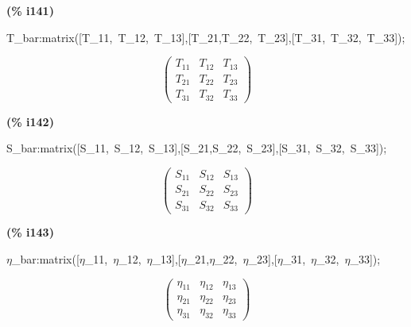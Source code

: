 \documentclass[fleqn]{article}
\begin{document}
\noindent
\begin{minipage}[t]{4.000000em}\color{red}\bfseries
(\% i141)	
\end{minipage}
\begin{minipage}[t]{\textwidth}\color{blue}
T\_bar:matrix([T\_11,\ T\_12,\ T\_13],[T\_21,T\_22,\ T\_23],[T\_31,\ T\_32,\ T\_33]);
\end{minipage}
\[\displaystyle \tag{\% o141} 
\begin{pmatrix}{T_{\ensuremath{\mathrm{11}}}} & {T_{\ensuremath{\mathrm{12}}}} & {T_{\ensuremath{\mathrm{13}}}}\\
{T_{\ensuremath{\mathrm{21}}}} & {T_{\ensuremath{\mathrm{22}}}} & {T_{\ensuremath{\mathrm{23}}}}\\
{T_{\ensuremath{\mathrm{31}}}} & {T_{\ensuremath{\mathrm{32}}}} & {T_{\ensuremath{\mathrm{33}}}}\end{pmatrix}\mbox{}
\]


\noindent
\begin{minipage}[t]{4.000000em}\color{red}\bfseries
(\% i142)	
\end{minipage}
\begin{minipage}[t]{\textwidth}\color{blue}
S\_bar:matrix([S\_11,\ S\_12,\ S\_13],[S\_21,S\_22,\ S\_23],[S\_31,\ S\_32,\ S\_33]);
\end{minipage}
\[\displaystyle \tag{\% o142} 
\begin{pmatrix}{S_{\ensuremath{\mathrm{11}}}} & {S_{\ensuremath{\mathrm{12}}}} & {S_{\ensuremath{\mathrm{13}}}}\\
{S_{\ensuremath{\mathrm{21}}}} & {S_{\ensuremath{\mathrm{22}}}} & {S_{\ensuremath{\mathrm{23}}}}\\
{S_{\ensuremath{\mathrm{31}}}} & {S_{\ensuremath{\mathrm{32}}}} & {S_{\ensuremath{\mathrm{33}}}}\end{pmatrix}\mbox{}
\]


\noindent
\begin{minipage}[t]{4.000000em}\color{red}\bfseries
(\% i143)	
\end{minipage}
\begin{minipage}[t]{\textwidth}\color{blue}
\ensuremath{\eta}\_bar:matrix([\ensuremath{\eta}\_11,\ \ensuremath{\eta}\_12,\ \ensuremath{\eta}\_13],[\ensuremath{\eta}\_21,\ensuremath{\eta}\_22,\ \ensuremath{\eta}\_23],[\ensuremath{\eta}\_31,\ \ensuremath{\eta}\_32,\ \ensuremath{\eta}\_33]);
\end{minipage}
\[\displaystyle \tag{\% o143} 
\begin{pmatrix}{{\eta }_{\ensuremath{\mathrm{11}}}} & {{\eta }_{\ensuremath{\mathrm{12}}}} & {{\eta }_{\ensuremath{\mathrm{13}}}}\\
{{\eta }_{\ensuremath{\mathrm{21}}}} & {{\eta }_{\ensuremath{\mathrm{22}}}} & {{\eta }_{\ensuremath{\mathrm{23}}}}\\
{{\eta }_{\ensuremath{\mathrm{31}}}} & {{\eta }_{\ensuremath{\mathrm{32}}}} & {{\eta }_{\ensuremath{\mathrm{33}}}}\end{pmatrix}\mbox{}
\]
\end{document}
